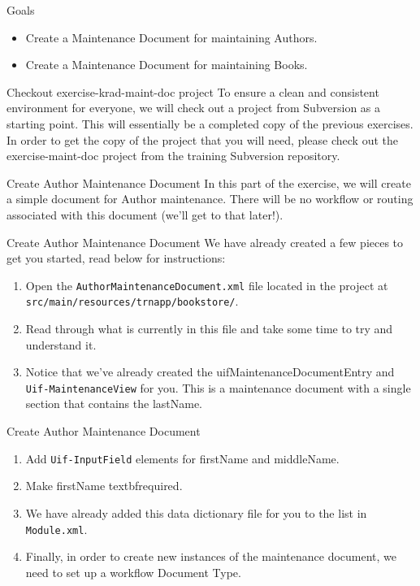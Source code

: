 \documentclass[xcolor=dvipsnames,14pt,professionalfonts]{beamer}
\begin{document}
\begin{frame}{Goals}
  \begin{itemize}
    \item Create a Maintenance Document for maintaining Authors.
    \item Create a Maintenance Document for maintaining Books.
  \end{itemize}
\end{frame}
\begin{frame}{Checkout exercise-krad-maint-doc project}
  To ensure a clean and consistent environment for everyone, we will check out a project from Subversion as a starting point.  This will essentially be a completed copy of the previous exercises.
In order to get the copy of the project that you will need, please
check out the exercise-maint-doc project from the training Subversion
repository.
\end{frame}
\begin{frame}{Create Author Maintenance Document}
  In this part of the exercise, we will create a simple document
    for Author maintenance.  There will be no workflow or routing
    associated with this document (we’ll get to that later!).
\end{frame}

\begin{frame}{Create Author Maintenance Document}
  We have already created a few pieces to get you started, read below for instructions:
  \begin{enumerate}
  \item Open the \texttt{AuthorMaintenanceDocument.xml} file located in the project at \texttt{src/main/resources/trnapp/bookstore/}.
  \item Read through what is currently in this file and take some time to try and understand it.
  \item Notice that we’ve already created the
    uifMaintenanceDocumentEntry and \texttt{Uif-MaintenanceView} for you.  This is a maintenance document with a single section that contains the lastName.
  \end{enumerate}
\end{frame}

\begin{frame}{Create Author Maintenance Document}
  \begin{enumerate}
  \item Add \texttt{Uif-InputField} elements for firstName and middleName.
  \item Make firstName textbf{required}.
  \item We have already added this data dictionary file for you to the list in \texttt{Module.xml}.
  \item Finally, in order to create new instances of the maintenance document, we need to set up a workflow Document Type.
  \end{enumerate}
\end{frame}
\end{document}
